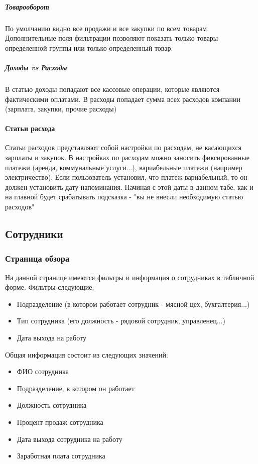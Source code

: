 \documentclass[DIV=calc, paper=a4, fontsize=11pt]{scrartcl} %
\begin{document}
\subparagraph{Товарооборот}
По умолчанию видно все продажи и все закупки по всем товарам. Дополнительные поля фильтрации позволяют показать только товары определенной группы или только определенный товар.

\subparagraph{Доходы vs Расходы}
В статью доходы попадают все кассовые операции, которые являются фактическими оплатами. В расходы попадает сумма всех расходов компании (зарплата, закупки, прочие расходы)

\paragraph{Статьи расхода}
Статьи расходов представляют собой настройки по расходам, не касающихся зарплаты и закупок. В настройках по расходам можно заносить фиксированные платежи (аренда, коммунальные услуги...), вариабельные платежи (например электричество). Если пользователь установил, что платеж вариабельный, то он должен установить дату напоминания. Начиная с этой даты в данном табе, как и на главной будет срабатывать подсказка - "вы не внесли необходимую статью расходов"



\subsection{Сотрудники}

\subsubsection{Страница обзора}

На данной странице имеются фильтры и информация о сотрудниках в табличной форме. Фильтры следующие:

\begin{itemize}
	\item Подразделение (в котором работает сотрудник - мясной цех, бухгалтерия...)
	\item Тип сотрудника (его должность - рядовой сотрудник, управленец...)
	\item Дата выхода на работу
\end{itemize}

Общая информация состоит из следующих значений:

\begin{itemize}
	\item ФИО сотрудника
	\item Подразделение, в котором он работает 
	\item Должность сотрудника
	\item Процент продаж сотрудника
	\item Дата выхода сотрудника на работу
	\item Заработная плата сотрудника
\end{itemize}
\end{document}
